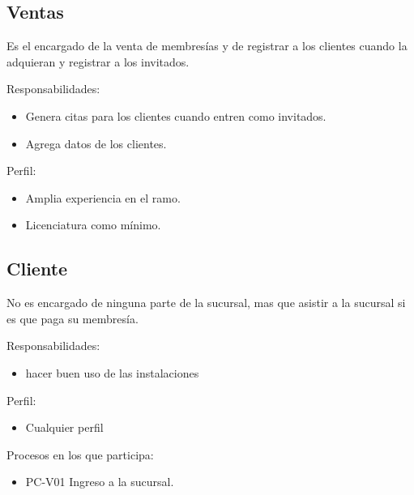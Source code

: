 \begin{Usuario}{\subsection{Ventas}}{
		Es el encargado de la venta de membresías y de registrar a los clientes cuando la adquieran y registrar a los invitados.
	}
	\item[Responsabilidades:] \cdtEmpty
	\begin{itemize}
		\item Genera citas para los clientes cuando entren como invitados.
		\item Agrega datos de los clientes.
	\end{itemize}
	
	\item[Perfil:] \cdtEmpty
	\begin{itemize}
		\item Amplia experiencia en el ramo.
		\item Licenciatura como mínimo.
	\end{itemize}
	
\end{Usuario}


\begin{Usuario}{\subsection{Cliente}}{
		No es encargado de ninguna parte de la sucursal, mas que asistir a la sucursal si es que paga su membresía.
	}
			\item[Responsabilidades:] \cdtEmpty
		\begin{itemize}
			\item hacer buen uso de las instalaciones
		\end{itemize}
		
		\item[Perfil:] \cdtEmpty
		\begin{itemize}
			\item Cualquier perfil
		\end{itemize}
		\item[Procesos en los que participa:] \cdtEmpty
		\begin{itemize}
			\item PC-V01 Ingreso a la sucursal.
			
		\end{itemize}

\end{Usuario}


